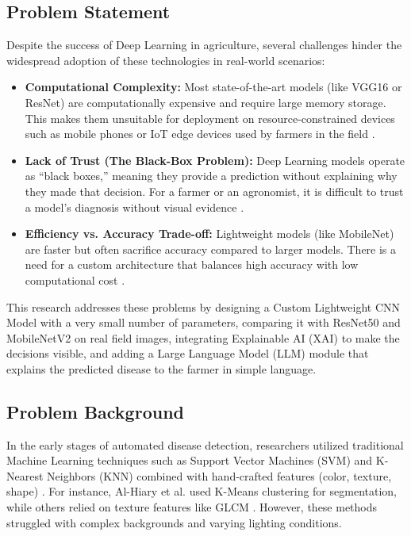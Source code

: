 \subsection{Problem Statement}
Despite the success of Deep Learning in agriculture, several challenges hinder the widespread adoption of these technologies in real-world scenarios:
\begin{itemize}
    \item \textbf{Computational Complexity:} Most state-of-the-art models (like VGG16 or ResNet) are computationally expensive and require large memory storage. This makes them unsuitable for deployment on resource-constrained devices such as mobile phones or IoT edge devices used by farmers in the field \cite{sandler2018mobilenetv2}.
    \item \textbf{Lack of Trust (The Black-Box Problem):} Deep Learning models operate as ``black boxes,'' meaning they provide a prediction without explaining why they made that decision. For a farmer or an agronomist, it is difficult to trust a model's diagnosis without visual evidence \cite{todros2022explainable}.
    \item \textbf{Efficiency vs. Accuracy Trade-off:} Lightweight models (like MobileNet) are faster but often sacrifice accuracy compared to larger models. There is a need for a custom architecture that balances high accuracy with low computational cost \cite{palmer2019mobilenets}.
\end{itemize}
This research addresses these problems by designing a Custom Lightweight CNN Model with a very small number of parameters, comparing it with ResNet50 and MobileNetV2 on real field images, integrating Explainable AI (XAI) to make the decisions visible, and adding a Large Language Model (LLM) module that explains the predicted disease to the farmer in simple language.

\subsection{Problem Background}
In the early stages of automated disease detection, researchers utilized traditional Machine Learning techniques such as Support Vector Machines (SVM) and K-Nearest Neighbors (KNN) combined with hand-crafted features (color, texture, shape) \cite{alhiary2011fast}. For instance, Al-Hiary et al. used K-Means clustering for segmentation, while others relied on texture features like GLCM \cite{pujari2016image, arivazhagan2013detection}. However, these methods struggled with complex backgrounds and varying lighting conditions.

